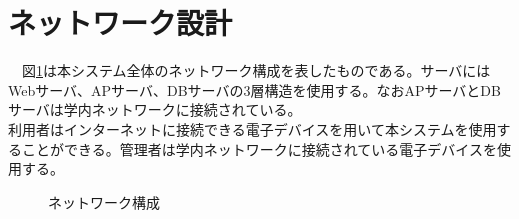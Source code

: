 \documentclass[a4j]{jarticle}
\begin{document}
\section{ネットワーク設計}
　図\ref{network:networktest}は本システム全体のネットワーク構成を表したものである。サーバにはWebサーバ、APサーバ、DBサーバの3層構造を使用する。なおAPサーバとDBサーバは学内ネットワークに接続されている。\\
利用者はインターネットに接続できる電子デバイスを用いて本システムを使用することができる。管理者は学内ネットワークに接続されている電子デバイスを使用する。
\begin{figure}[H]
\begin{center}
\caption{ネットワーク構成}
\label{network:networktest}
\end{center}
\end{figure}
\end{document}
